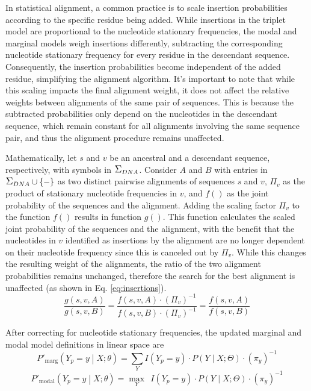 
In statistical alignment, a common practice is to scale insertion probabilities according to the specific residue being added. While insertions in the triplet model are proportional to the nucleotide stationary frequencies, the modal and marginal models weigh insertions differently, subtracting the corresponding nucleotide stationary frequency for every residue in the descendant sequence. Consequently, the insertion probabilities become independent of the added residue, simplifying the alignment algorithm. It's important to note that while this scaling impacts the final alignment weight, it does not affect the relative weights between alignments of the same pair of sequences. This is because the subtracted probabilities only depend on the nucleotides in the descendant sequence, which remain constant for all alignments involving the same sequence pair, and thus the alignment procedure remains unaffected.

Mathematically, let $s$ and $v$ be an ancestral and a descendant sequence, respectively, with symbols in $\grande{\Sigma}_{DNA}$. Consider $A$ and $B$ with entries in $\grande{\Sigma}_{DNA} \cup \{-\}$ as two distinct pairwise alignments of sequences $s$ and $v$, $\Pi_v$ as the product of stationary nucleotide frequencies in $v$, and $f()$ as the joint probability of the sequences and the alignment. Adding the scaling factor $\Pi_{v}$ to the function $f()$ results in function $g()$. This function calculates the scaled joint probability of the sequences and the alignment, with the benefit that the nucleotides in $v$ identified as insertions by the alignment are no longer dependent on their nucleotide frequency since this is canceled out by $\Pi_{v}$. While this changes the resulting weight of the alignments, the ratio of the two alignment probabilities remains unchanged, therefore the search for the best alignment is unaffected (as shown in Eq. \ref{eq:insertions}).
\begin{equation} \label{eq:insertions}
\frac{g(s, v, A)}{g(s, v, B)} = \frac{f(s, v, A) \cdot (\Pi_v)^{-1}}{f(s, v, B) \cdot (\Pi_v)^{-1}} = \frac{f(s, v, A)}{f(s, v, B)}
\end{equation}

After correcting for nucleotide stationary frequencies, the updated marginal and modal model definitions in linear space are
\begin{equation} \label{eq:marginal}
P'_\text{marg}\left(Y_p = y \middle| X;\theta \right) =
\sum_{Y} I(Y_p = y) \cdot P\left(Y \middle| X;\Theta \right) \cdot (\pi_y)^{-1}
\end{equation}
\begin{equation} \label{eq:modal}
P'_\text{modal}\left(Y_p = y \middle| X;\theta \right) =
\max_{Y}\ \ I(Y_p = y) \cdot P\left(Y \middle| X;\Theta \right) \cdot (\pi_y)^{-1}
\end{equation}

